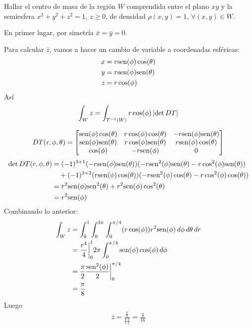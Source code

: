 \begin{ejemplo}
Hallar el centro de masa de la regi\'on $W$ comprendida entre el plano $xy$ y la semiesfera $x^2+y^2+z^2=1$, $z \geq 0$, de densidad $ \rho(x,y)=1 $, $ \forall (x,y) \in W $.

\medskip

\begin{solucion}
En primer lugar, por simetr\'ia $ \bar x = \bar y = 0 $.

Para calcular $ \bar z $, vamos a hacer un cambio de variable a
coordenadas esf\'ericas:
\begin{align*}
    x &= r \text{sen}(\phi) \cos(\theta) \\
    y &= r \text{sen}(\phi) \text{sen}(\theta) \\
    z &= r \cos(\phi)
\end{align*}
As\'i
\[
    \int_W z = \int_{T^{-1}(W)} r \cos(\phi)
    \left\lvert\det DT\right\rvert
\]

\[
    DT(r, \phi, \theta) =
    \begin{bmatrix}
        \text{sen}(\phi) \cos(\theta) &     r \cos(\phi) \cos(\theta) &
        -r \text{sen}(\phi) \text{sen}(\theta) \\
        \text{sen}(\phi) \text{sen}(\theta) &     r \cos(\phi) \text{sen}(\theta) &
        r \text{sen}(\phi) \cos(\theta) \\
        \cos(\phi) &                 -r \text{sen}(\phi) &
        0
    \end{bmatrix}
\]
\begin{align*}
    \det DT(r, \phi, \theta)
    &= (-1)^{3+1} (-r \text{sen}(\phi) \text{sen}(\theta))
        (-r \text{sen}^2(\phi) \text{sen}(\theta) - r \cos^2(\phi) \text{sen}(\theta))  \\
    & \quad + (-1)^{3+2} (r \text{sen}(\phi) \cos(\theta) )
        (-r \text{sen}^2(\phi) \cos(\theta) - r \cos^2(\phi) \cos(\theta)) \\
    &= r^2 \text{sen}(\phi) \text{sen}^2(\theta) + r^2 \text{sen}(\phi) \cos^2(\theta) \\
    &= r^2 \text{sen}(\phi)
\end{align*}
Combinando lo anterior:
\begin{align*}
\int_W z &= \int_0^1 \int_0^{2\pi} \int_0^{\pi/4} (r \cos(\phi))
    r^2 \text{sen}(\phi) \, d\phi\, d\theta \, dr \\
&= \frac{r^4}{4} \biggr |_0^1 2 \pi \int_0^{\pi/4} \text{sen}(\phi) \cos
    (\phi) \, d\phi \\
&= \frac{\pi}{2} \frac{\text{sen}^2(\phi)}{2} \biggr |_0^{\pi/4} \\
&= \frac{\pi}{8}
\end{align*}
Luego
\begin{align*}
\bar z = \frac{\frac{\pi}{8}}{\frac{4}{3} \frac{\pi}{2}} =
\frac{3}{16}
\end{align*}
\end{solucion}
\end{ejemplo}

